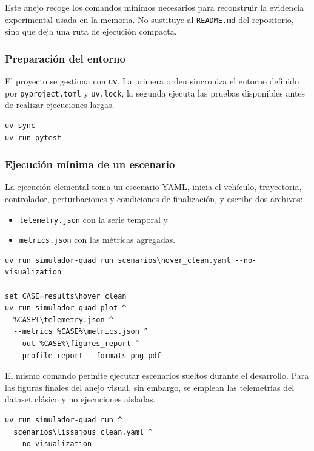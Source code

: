 Este anejo recoge los comandos mínimos necesarios para reconstruir la evidencia
experimental usada en la memoria. No sustituye al \texttt{README.md} del repositorio,
sino que deja una ruta de ejecución compacta.

\subsubsection*{Preparación del entorno}

El proyecto se gestiona con \texttt{uv}. La primera orden sincroniza el entorno
definido por \texttt{pyproject.toml} y \texttt{uv.lock}, la segunda ejecuta las
pruebas disponibles antes de realizar ejecuciones largas.

\begin{verbatim}
uv sync
uv run pytest
\end{verbatim}

\subsubsection*{Ejecución mínima de un escenario}

La ejecución elemental toma un escenario YAML, inicia el vehículo, trayectoria,
controlador, perturbaciones y condiciones de finalización, y escribe dos
archivos:
\begin{itemize}
  \item \texttt{telemetry.json} con la serie temporal y
  \item \texttt{metrics.json} con las métricas agregadas.
\end{itemize}

\begin{verbatim}
uv run simulador-quad run scenarios\hover_clean.yaml --no-visualization

set CASE=results\hover_clean
uv run simulador-quad plot ^
  %CASE%\telemetry.json ^
  --metrics %CASE%\metrics.json ^
  --out %CASE%\figures_report ^
  --profile report --formats png pdf
\end{verbatim}

El mismo comando permite ejecutar escenarios sueltos durante el desarrollo.
Para las figuras finales del anejo visual, sin embargo, se emplean las telemetrías
del dataset clásico y no ejecuciones aisladas.

\begin{verbatim}
uv run simulador-quad run ^
  scenarios\lissajous_clean.yaml ^
  --no-visualization
\end{verbatim}

